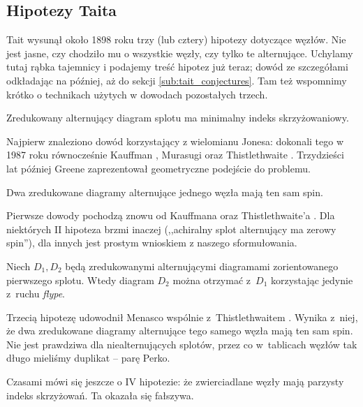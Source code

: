 
\subsection{Hipotezy Taita}
%

Tait wysunął około 1898 roku trzy (lub cztery) hipotezy dotyczące węzłów.
Nie jest jasne, czy chodziło mu o wszystkie węzły, czy tylko te alternujące.
Uchylamy tutaj rąbka tajemnicy i podajemy treść hipotez już teraz; dowód ze szczegółami odkładając na później, aż do sekcji \ref{sub:tait_conjectures}.
Tam też wspomnimy krótko o technikach użytych w dowodach pozostałych trzech.

\begin{conjecture}
%
\label{con:tait_1}%
    Zredukowany alternujący diagram splotu ma minimalny indeks skrzyżowaniowy.
\end{conjecture}

Najpierw znaleziono dowód korzystający z wielomianu Jonesa: dokonali tego w 1987 roku równocześnie Kauffman \cite{kauffman87}, Murasugi \cite{murasugi87} oraz Thistlethwaite \cite{thistlethwaite87}.
%
%
%
Trzydzieści lat później Greene \cite{greene17} zaprezentował geometryczne podejście do problemu.
%

\begin{conjecture}
%
    Dwa zredukowane diagramy alternujące jednego węzła mają ten sam spin.
\end{conjecture}

Pierwsze dowody pochodzą znowu od Kauffmana \cite{kauffman87} oraz Thistlethwaite'a \cite{thistlethwaite87}.
%
%
Dla niektórych II hipoteza brzmi inaczej (,,achiralny splot alternujący ma zerowy spin''), dla innych jest prostym wnioskiem z naszego sformułowania.

\begin{conjecture}
%
    Niech $D_1, D_2$ będą zredukowanymi alternującymi diagramami zorientowanego pierwszego splotu.
    Wtedy diagram $D_2$ można otrzymać z~$D_1$ korzystając jedynie z~ruchu \emph{flype}.
\end{conjecture}

Trzecią hipotezę udowodnił Menasco wspólnie z~Thistlethwaitem \cite{menasco93}.
%
%
Wynika z~niej, że dwa zredukowane diagramy alternujące tego samego węzła mają ten sam spin.
Nie jest prawdziwa dla niealternujących splotów, przez co w~tablicach węzłów tak długo mieliśmy duplikat -- parę Perko.
%

Czasami mówi się jeszcze o IV hipotezie: że zwierciadlane węzły mają parzysty indeks skrzyżowań.
Ta okazała się fałszywa.

%


